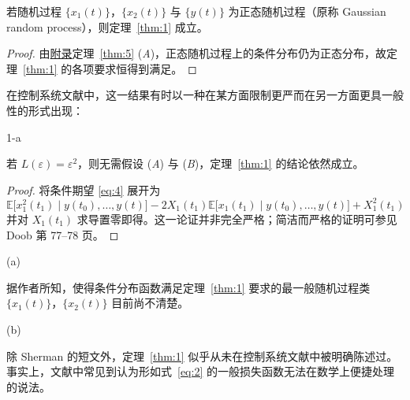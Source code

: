 \begin{corollary}\label{cor:1}

若随机过程 $\{x_1(t)\}$，$\{x_2(t)\}$ 与 $\{y(t)\}$ 为正态随机过程（原称 Gaussian random process），则定理~\ref{thm:1} 成立。

\end{corollary}

\begin{proof}

由\hyperref[sec:appendix]{附录}定理~\ref{thm:5} (\emph{A})，正态随机过程上的条件分布仍为正态分布，故定理~\ref{thm:1} 的各项要求恒得到满足。

\end{proof}

在控制系统文献中，这一结果有时以一种在某方面限制更严而在另一方面更具一般性的形式出现：

\begin{theoremn}{1-a}\label{thm:1a}

若 $L(\varepsilon) = \varepsilon^2$，则无需假设 (\emph{A}) 与 (\emph{B})，定理~\ref{thm:1} 的结论依然成立。

\end{theoremn}

\begin{proof}

将条件期望 \eqref{eq:4} 展开为
\begin{equation*}
\mathbb{E}\bigl[x_1^2(t_1) \mid y(t_0), \dots, y(t)\bigr] - 2X_1(t_1)\mathbb{E}\bigl[x_1(t_1) \mid y(t_0), \dots, y(t)\bigr] + X_1^2(t_1)
\end{equation*}
并对 $X_1(t_1)$ 求导置零即得。这一论证并非完全严格；简洁而严格的证明可参见 Doob \cite{r15} 第 77–78 页。

\end{proof}

\begin{remarkn}{(a)}\label{rem:a}

据作者所知，使得条件分布函数满足定理~\ref{thm:1} 要求的最一般随机过程类 $\{x_1(t)\}$，$\{x_2(t)\}$ 目前尚不清楚。

\end{remarkn}

\begin{remarkn}{(b)}\label{rem:b}

除 Sherman 的短文外，定理~\ref{thm:1} 似乎从未在控制系统文献中被明确陈述过。事实上，文献中常见到认为形如式~\eqref{eq:2} 的一般损失函数无法在数学上便捷处理的说法。

\end{remarkn}

